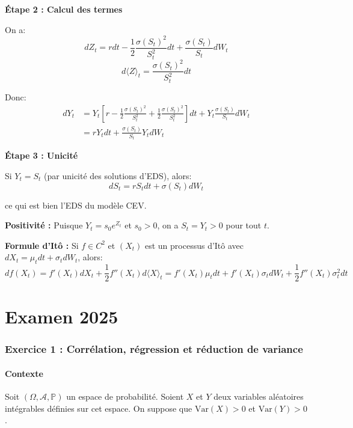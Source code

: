 \documentclass[12pt,a4paper]{article}
\theoremstyle{definition}
\newcommand{\Var}{\mathrm{Var}}
\newcommand{\prob}{\mathbb{P}}
\begin{document}
\textbf{Étape 2 : Calcul des termes}

On a:
\[
dZ_t = r dt - \frac{1}{2}\frac{\sigma(S_t)^2}{S_t^2} dt + \frac{\sigma(S_t)}{S_t} dW_t
\]
\[
d\langle Z \rangle_t = \frac{\sigma(S_t)^2}{S_t^2} dt
\]

Donc:
\begin{align*}
dY_t &= Y_t \left[ r - \frac{1}{2}\frac{\sigma(S_t)^2}{S_t^2} + \frac{1}{2}\frac{\sigma(S_t)^2}{S_t^2} \right] dt + Y_t \frac{\sigma(S_t)}{S_t} dW_t \\
&= r Y_t dt + \frac{\sigma(S_t)}{S_t} Y_t dW_t
\end{align*}

\textbf{Étape 3 : Unicité}

Si $Y_t = S_t$ (par unicité des solutions d'EDS), alors:
\[
dS_t = rS_t dt + \sigma(S_t) dW_t
\]

ce qui est bien l'EDS du modèle CEV.

\textbf{Positivité :} Puisque $Y_t = s_0 e^{Z_t}$ et $s_0 > 0$, on a $S_t = Y_t > 0$ pour tout $t$.

\begin{rappel}
\textbf{Formule d'Itô :} Si $f \in C^2$ et $(X_t)$ est un processus d'Itô avec $dX_t = \mu_t dt + \sigma_t dW_t$, alors:
\[
df(X_t) = f'(X_t)dX_t + \frac{1}{2}f''(X_t)d\langle X \rangle_t = f'(X_t)\mu_t dt + f'(X_t)\sigma_t dW_t + \frac{1}{2}f''(X_t)\sigma_t^2 dt
\]
\end{rappel}

\newpage
\part{Examen 2025}

\section{Exercice 1 : Corrélation, régression et réduction de variance}

\subsection{Contexte}

Soit $(\Omega, \mathcal{A}, \prob)$ un espace de probabilité. Soient $X$ et $Y$ deux variables aléatoires intégrables définies sur cet espace. On suppose que $\Var(X) > 0$ et $\Var(Y) > 0$.
\end{document}
